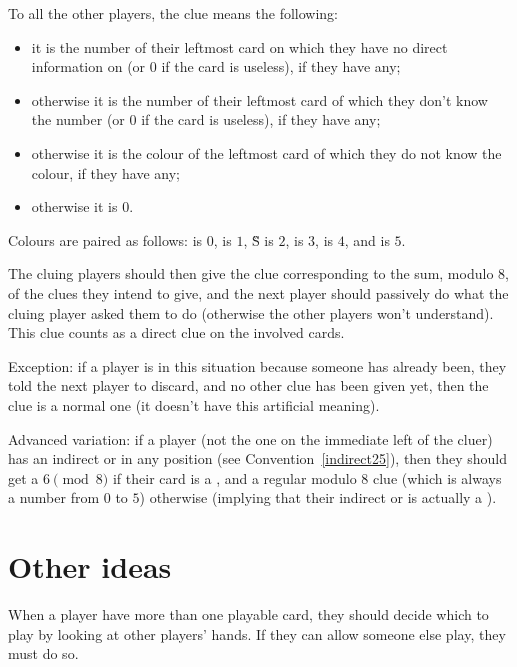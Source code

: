 \documentclass[a4paper]{article}
\theoremstyle{plain}
\theoremstyle{definition}
\begin{document}
To all the other players, the clue means the following:

\begin{itemize}
	\item it is the number of their leftmost card on which they have no direct information on (or $0$ if the card is useless), if they have any;
	\item otherwise it is the number of their leftmost card of which they don't know the number (or $0$ if the card is useless), if they have any;
	\item otherwise it is the colour of the leftmost card of which they do not know the colour, if they have any;
	\item otherwise it is $0$. 
\end{itemize}

Colours are paired as follows:  is $0$,  is $1$, \G{S} is $2$,  is $3$,  is $4$, and  is $5$.

The cluing players should then give the clue corresponding to the sum, modulo 8, of the clues they intend to give, and the next player should passively do what the cluing player asked them to do (otherwise the other players won't understand). This clue counts as a direct clue on the involved cards.

Exception: if a player is in this situation because someone has already been, they told the next player to discard, and no other clue has been given yet, then the clue is a normal one (it doesn't have this artificial meaning).

Advanced variation: if a player (not the one on the immediate left of the cluer) has an indirect  or  in any position (see Convention~\ref{indirect25}), then they should get a $6 \pmod 8$ if their card is a , and a regular modulo $8$ clue (which is always a number from $0$ to $5$) otherwise (implying that their indirect  or  is actually a ).

\section{Other ideas}

When a player have more than one playable card, they should decide which to play by looking at other players' hands. If they can allow someone else play, they must do so.
\end{document}
